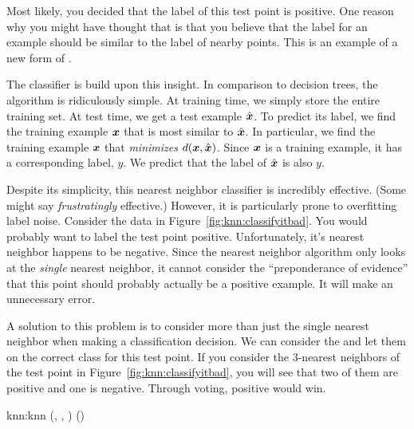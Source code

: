 Most likely, you decided that the label of this test point is
positive.  One reason why you might have thought that is that you
believe that the label for an example should be similar to the label
of nearby points.  This is an example of a new form of
.

The  classifier is build upon this insight.
In comparison to decision trees, the algorithm is ridiculously
simple.  At training time, we simply store the entire training set.
At test time, we get a test example $\hat\vx$.  To predict its label,
we find the training example ${\boldsymbol{x}}$ that is most similar to $\hat\vx$.
In particular, we find the training example ${\boldsymbol{x}}$ that
\emph{minimizes} $d({\boldsymbol{x}},\hat{{\boldsymbol{x}}})$.  Since ${\boldsymbol{x}}$ is a training example,
it has a corresponding label, $y$.  We predict that the label of
$\hat\vx$ is also $y$.


Despite its simplicity, this nearest neighbor classifier is incredibly
effective.  (Some might say \emph{frustratingly} effective.)  However,
it is particularly prone to overfitting label noise.  Consider the
data in Figure~\ref{fig:knn:classifyitbad}.  You would probably want
to label the test point positive.  Unfortunately, it's nearest
neighbor happens to be negative.  Since the nearest neighbor algorithm
only looks at the \emph{single} nearest neighbor, it cannot consider
the ``preponderance of evidence'' that this point should probably
actually be a positive example.  It will make an unnecessary error.

A solution to this problem is to consider more than just the single
nearest neighbor when making a classification decision.  We can
consider the  and
let them  on the correct class for this test point.  If
you consider the $3$-nearest neighbors of the test point in
Figure~\ref{fig:knn:classifyitbad}, you will see that two of them are
positive and one is negative.  Through voting, positive would win.


\newalgorithm%
  {knn:knn}%
  {(, , \VAR{$\hat\vx$})}
  {
 
\ENDFOR
{} 
 
 
\ENDFOR
\RETURN {}() 
}


